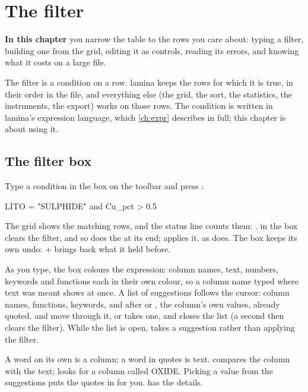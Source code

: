 \chapter{The filter}\label{ch:filter}
\begin{goals}
\textbf{In this chapter} you narrow the table to the rows you care about: typing a filter, building one
from the grid, editing it as controls, reading its errors, and knowing what it costs on a large file.
\end{goals}

The filter is a condition on a row. lamina keeps the rows for which it is true, in their order in the
file, and everything else (the grid, the sort, the statistics, the instruments, the export) works on
those rows. The condition is written in lamina's expression language, which \cref{ch:expr} describes in
full; this chapter is about using it.

\section{The filter box}\label{sec:filter-box}

Type a condition in the box on the toolbar and press :

\begin{codeblock}
LITO = "SULPHIDE" and Cu_pct > 0.5
\end{codeblock}

The grid shows the matching rows, and the status line counts them:
.  in the box clears the filter, and so does the 
at its end;  applies it, as  does. The box keeps its own undo: +
brings back what it held before.

As you type, the box colours the expression: column names, text, numbers, keywords and functions each
in their own colour, so a column name typed where text was meant shows at once. A list of suggestions
follows the cursor: column names, functions, keywords, and after  or , the
column's own values, already quoted.  and  move through it,  or 
takes one, and  closes the list (a second  then clears the filter). While the list is
open,  takes a suggestion rather than applying the filter.

\begin{note}
A word on its own is a column; a word in quotes is text.  compares the column with
the text;  looks for a column called OXIDE. Picking a value from the suggestions puts
the quotes in for you.  has the details.
\end{note}

